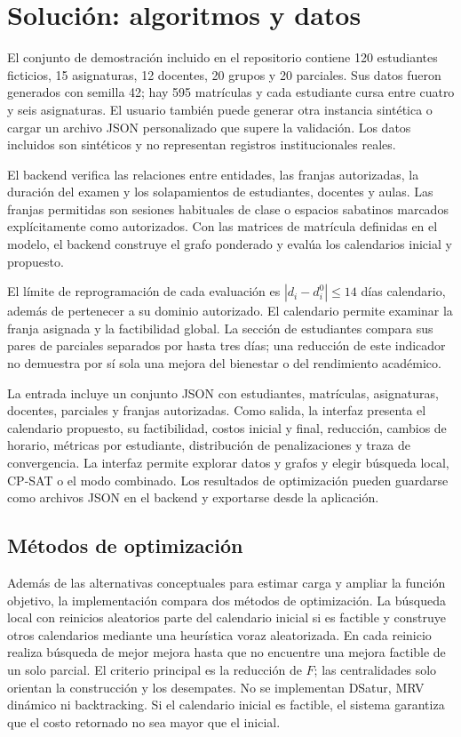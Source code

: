 \documentclass[conference]{IEEEtran}
\begin{document}
\section{Solución: algoritmos y datos}
El conjunto de demostración incluido en el repositorio contiene 120 estudiantes ficticios, 15 asignaturas, 12 docentes, 20 grupos y 20 parciales. Sus datos fueron generados con semilla 42; hay 595 matrículas y cada estudiante cursa entre cuatro y seis asignaturas. El usuario también puede generar otra instancia sintética o cargar un archivo JSON personalizado que supere la validación. Los datos incluidos son sintéticos y no representan registros institucionales reales.

El backend verifica las relaciones entre entidades, las franjas autorizadas, la duración del examen y los solapamientos de estudiantes, docentes y aulas. Las franjas permitidas son sesiones habituales de clase o espacios sabatinos marcados explícitamente como autorizados. Con las matrices de matrícula definidas en el modelo, el backend construye el grafo ponderado y evalúa los calendarios inicial y propuesto.

El límite de reprogramación de cada evaluación es $|d_i-d_i^0|\leq 14$ días calendario, además de pertenecer a su dominio autorizado. El calendario permite examinar la franja asignada y la factibilidad global. La sección de estudiantes compara sus pares de parciales separados por hasta tres días; una reducción de este indicador no demuestra por sí sola una mejora del bienestar o del rendimiento académico.

La entrada incluye un conjunto JSON con estudiantes, matrículas, asignaturas, docentes, parciales y franjas autorizadas. Como salida, la interfaz presenta el calendario propuesto, su factibilidad, costos inicial y final, reducción, cambios de horario, métricas por estudiante, distribución de penalizaciones y traza de convergencia. La interfaz permite explorar datos y grafos y elegir búsqueda local, CP-SAT o el modo combinado. Los resultados de optimización pueden guardarse como archivos JSON en el backend y exportarse desde la aplicación.

\subsection{Métodos de optimización}
Además de las alternativas conceptuales para estimar carga y ampliar la función objetivo, la implementación compara dos métodos de optimización. La búsqueda local con reinicios aleatorios parte del calendario inicial si es factible y construye otros calendarios mediante una heurística voraz aleatorizada. En cada reinicio realiza búsqueda de mejor mejora hasta que no encuentre una mejora factible de un solo parcial. El criterio principal es la reducción de $F$; las centralidades solo orientan la construcción y los desempates. No se implementan DSatur, MRV dinámico ni backtracking. Si el calendario inicial es factible, el sistema garantiza que el costo retornado no sea mayor que el inicial.
\end{document}
